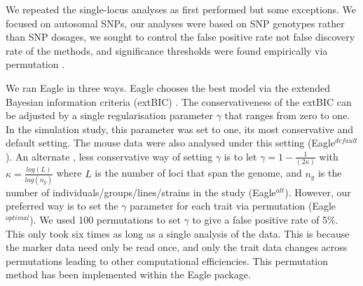 \documentclass{bioinfo}
\begin{document}
We repeated the single-locus analyses as first performed \citep{nicod2016genome} but some exceptions. We 
focused on autosomal SNPs, our analyses were based on SNP genotypes  rather than SNP dosages, 
we sought to control the false positive rate not false discovery rate of the methods, and significance thresholds were 
found empirically via permutation \textcolor{red}{\citep{doerge1996permutation}}.


We ran Eagle in three ways. 
Eagle chooses the best model via the extended Bayesian information criteria (extBIC) \citep{chen2008extended}. 
  The conservativeness of the extBIC can be adjusted by a single regularisation parameter  $\gamma$ that ranges from zero to one. 
In the simulation study, this parameter was set to one, its most conservative and default setting. The mouse data were also analysed 
under this setting (Eagle$^{default}$).  An alternate  \citep{chen2008extended}, less conservative way of setting $\gamma$ is to  let $\gamma = 1 - \frac{1}{(2\kappa)}$ with $\kappa=\frac{log(L)}{log(n_g)}$ where 
 $L$ is the number of loci that span the genome, and $n_g$ is the number of individuals/groups/lines/strains in the study
  (Eagle$^{alt}$). However, our preferred way is to set the $\gamma$ parameter for each trait via permutation (Eagle$^{optimal}$).  We used 100 permutations to set $\gamma$ to give a false  positive rate of 5\%.  This only took six times as long as a single analysis of the data. This is because the marker data need only be read  once, 
 and only the trait data changes across permutations leading to other computational efficiencies.  
  This permutation method has been implemented within the
 Eagle package. 
  
  
\end{document}
